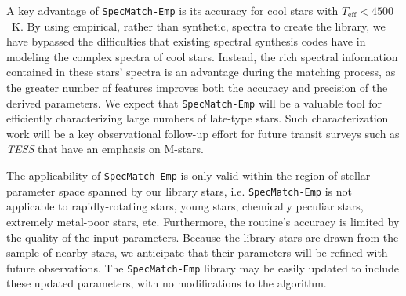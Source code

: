 \documentclass[preprint2]{aastex6}
\newcommand{\SpecMatch}{\texttt{SpecMatch-Emp}\xspace}
\newcommand{\teff}{\ensuremath{T_{\mathrm{eff}}}\xspace}
\begin{document}
A key advantage of \SpecMatch is its accuracy for cool stars with $\teff < 4500$~K. By using empirical, rather than synthetic, spectra to create the library, we have bypassed the difficulties that existing spectral synthesis codes have in modeling the complex spectra of cool stars. Instead, the rich spectral information contained in these stars' spectra is an advantage during the matching process, as the greater number of features improves both the accuracy and precision of the derived parameters. We expect that \SpecMatch will be a valuable tool for efficiently characterizing large numbers of late-type stars. Such characterization work will be a key observational follow-up effort for future transit surveys such as {\em TESS} \citep{Ricker14} that have an emphasis on M-stars.

The applicability of \SpecMatch is only valid within the region of stellar parameter space spanned by our library stars, i.e. \SpecMatch is not applicable to rapidly-rotating stars, young stars, chemically peculiar stars, extremely metal-poor stars, etc. Furthermore, the routine's accuracy is limited by the quality of the input parameters. Because the library stars are drawn from the sample of nearby stars, we anticipate that their parameters will be refined with future observations. The \SpecMatch library may be easily updated to include these updated parameters, with no modifications to the algorithm.
\end{document}
